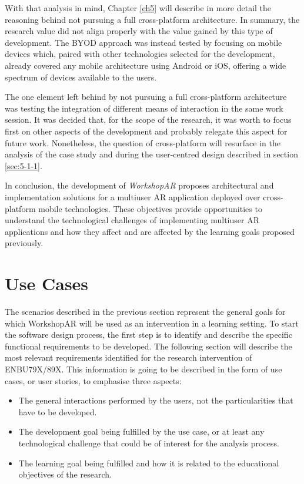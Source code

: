With that analysis in mind, Chapter \ref{ch5} will describe in more detail the reasoning behind not  pursuing a full cross-platform architecture. In summary, the research
value did not align properly with the value gained by this type of development. The \ac{BYOD} approach was instead tested by focusing on mobile devices which, paired with
other technologies selected for the development, already covered any mobile architecture using Android or iOS, offering a wide spectrum of devices available to the users.

The one element left behind by not pursuing a full cross-platform architecture was testing the integration of different means of interaction in the same work session. It
was decided that, for the scope of the research, it was worth to focus first on other aspects of the development and probably relegate this aspect for future work.
Nonetheless, the question of cross-platform will resurface in the analysis of the case study and during the user-centred design described in section \ref{sec:5-1-1}.

In conclusion, the development of \emph{WorkshopAR} proposes architectural and implementation solutions for a multiuser \ac{AR} application deployed over cross-platform
mobile technologies. These objectives provide opportunities to understand the technological challenges of implementing multiuser \ac{AR} applications and how they affect
and are affected by the learning goals proposed previously.

\section{Use Cases \label{sec:4-2}}

The scenarios described in the previous section represent the general goals for which WorkshopAR will be used as an intervention in a learning setting. To start the
software design process, the first step is to identify and describe the specific functional requirements to be developed. The following section will describe the most
relevant requirements identified for the research intervention of ENBU79X/89X. This information is going to be described in the form of use cases, or user stories, to
emphasise three aspects:

\begin{itemize}
    \item The general interactions performed by the users, not the particularities that have to be developed.
    \item The development goal being fulfilled by the use case, or at least any technological challenge that could be of interest for the analysis process.
    \item The learning goal being fulfilled and how it is related to the educational objectives of the research.
\end{itemize}

